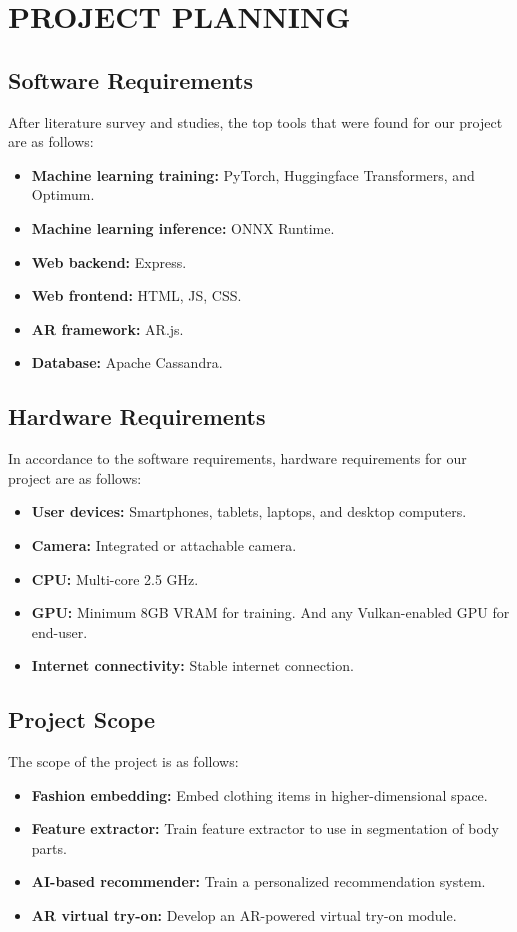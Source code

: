 \chapter[Project Planning]{PROJECT PLANNING}

\section{Software Requirements}
	After literature survey and studies, the top tools that were found for our project are as follows:

	\begin{itemize}
		\item \textbf{Machine learning training:} PyTorch, Huggingface Transformers, and Optimum.
		\item \textbf{Machine learning inference:} ONNX Runtime.
		\item \textbf{Web backend:} Express.
		\item \textbf{Web frontend:} HTML, JS, CSS.
		\item \textbf{AR framework:} AR.js.
		\item \textbf{Database:} Apache Cassandra.
	\end{itemize}

\section{Hardware Requirements}
	In accordance to the software requirements, hardware requirements for our project are as follows:

	\begin{itemize}
		\item \textbf{User devices:} Smartphones, tablets, laptops, and desktop computers.
		\item \textbf{Camera:} Integrated or attachable camera.
		\item \textbf{CPU:} Multi-core 2.5 GHz.
		\item \textbf{GPU:} Minimum 8GB VRAM for training. And any Vulkan-enabled GPU for end-user.
		\item \textbf{Internet connectivity:} Stable internet connection.
	\end{itemize}

\section{Project Scope}
	The scope of the project is as follows:
	
	\begin{itemize}
		\item \textbf{Fashion embedding:} Embed clothing items in higher-dimensional space.
		\item \textbf{Feature extractor:} Train feature extractor to use in segmentation of body parts.
		\item \textbf{AI-based recommender:} Train a personalized recommendation system.
		\item \textbf{AR virtual try-on:} Develop an AR-powered virtual try-on module.
	\end{itemize}

